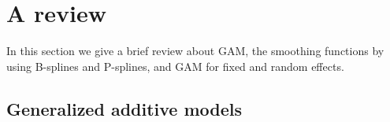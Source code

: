 \documentclass[11pt,letterpaper]{article}
\begin{document}




\section{A review} \label{sec:review} 
 
In this section we give a brief review about GAM, the smoothing functions by using B-splines and P-splines, and  GAM for fixed and random effects. 
 
 \subsection{Generalized additive models}
 
\end{document}
